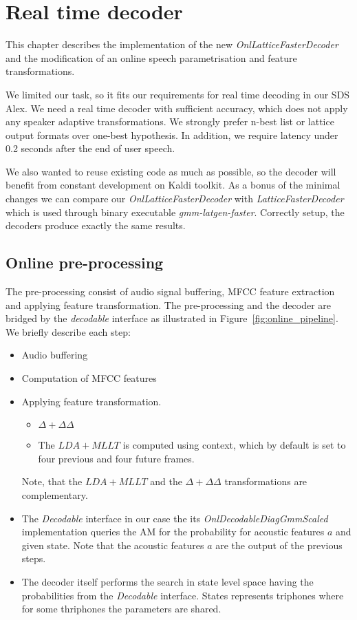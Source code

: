 \chapter{Real time decoder}
\label{cha:decoder}

This chapter describes the implementation
of the new {\it OnlLatticeFasterDecoder}\/ and 
the modification of an online speech parametrisation and feature transformations.

We limited our task, so it fits our requirements for real time decoding
in our \ac{SDS} Alex.
We need a real time decoder with sufficient accuracy,
which does not apply any speaker adaptive transformations.
We strongly prefer n-best list or lattice output formats over one-best hypothesis.
In addition, we require latency under 0.2 seconds after the end of user speech.

We also wanted to reuse existing code as much as possible,
so the decoder will benefit from constant development on Kaldi toolkit.
As a bonus of the minimal changes we can compare our {\it OnlLatticeFasterDecoder}\/ 
with {\it LatticeFasterDecoder}\/ which is used through binary executable {\it gmm-latgen-faster}.
Correctly setup, the decoders produce exactly the same results.


\section{Online pre-processing} 
\label{sec:onl_preprocess}
The pre-processing consist of audio signal buffering, \ac{MFCC} feature extraction and
applying feature transformation. 
The pre-processing and the decoder are bridged by the {\it decodable} 
interface as illustrated in Figure~\ref{fig:online_pipeline}.
We briefly describe each step:
\begin{itemize}
    \item Audio buffering
    \item Computation of \ac{MFCC} features
    \item Applying feature transformation. 
        \begin{itemize}
            \item $\Delta + \Delta\Delta$ 
            \item The $LDA+MLLT$ is computed using context,
                which by default is set to four previous and four future frames.
        \end{itemize}
        Note, that the $LDA+MLLT$ and the $\Delta+\Delta\Delta$ transformations are complementary.
    \item The {\it Decodable}\/ interface in our case the its {\it OnlDecodableDiagGmmScaled}\/ implementation
        queries the \ac{AM} for the probability for acoustic features $a$ and given state.
        Note that the acoustic features $a$ are the output of the previous steps.
    \item The decoder itself performs the search in state level space 
        having the probabilities from the {\it Decodable}\/ interface. 
        States represents triphones where for some thriphones the parameters are shared.
\end{itemize}

